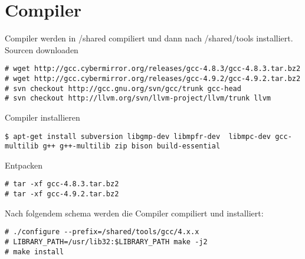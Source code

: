 \chapter{Compiler}
Compiler werden in /shared compiliert und dann nach /shared/tools installiert.
Sourcen downloaden
\begin{lstlisting}[style=Bash]
# wget http://gcc.cybermirror.org/releases/gcc-4.8.3/gcc-4.8.3.tar.bz2
# wget http://gcc.cybermirror.org/releases/gcc-4.9.2/gcc-4.9.2.tar.bz2
# svn checkout http://gcc.gnu.org/svn/gcc/trunk gcc-head
# svn checkout http://llvm.org/svn/llvm-project/llvm/trunk llvm
\end{lstlisting}
Compiler installieren
\begin{lstlisting}[style=Bash]
$ apt-get install subversion libgmp-dev libmpfr-dev  libmpc-dev gcc-multilib g++ g++-multilib zip bison build-essential
\end{lstlisting}
Entpacken 
\begin{lstlisting}[style=Bash]
# tar -xf gcc-4.8.3.tar.bz2
# tar -xf gcc-4.9.2.tar.bz2
\end{lstlisting}
Nach folgendem schema werden die Compiler compiliert und installiert:
\begin{lstlisting}[style=Bash]
# ./configure --prefix=/shared/tools/gcc/4.x.x
# LIBRARY_PATH=/usr/lib32:$LIBRARY_PATH make -j2
# make install
\end{lstlisting}
